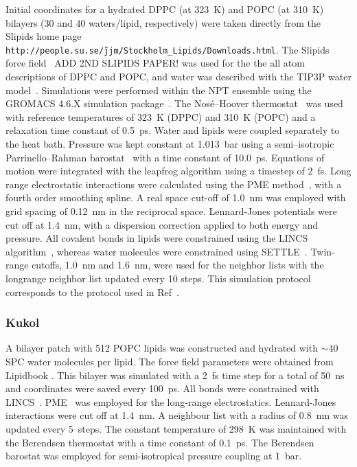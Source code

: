 \documentclass[pre,aps,floatfix,authordate1-4,twocolumn]{revtex4-1}
\begin{document}
Initial coordinates for a hydrated DPPC (at 323~K) and POPC (at 310~K) bilayers (30 and 40 waters/lipid, respectively) were taken directly from the Slipids home page \texttt{http://people.su.se/\~jjm/Stockholm\_Lipids/Downloads.html}.  The Slipids force field~\cite{jambeck12,XXX} ADD 2ND SLIPIDS PAPER! was used for the the all atom descriptions of DPPC and POPC, and
water was described with the TIP3P water model~\cite{jorgensen83}. Simulations were performed within the NPT ensemble using the GROMACS 4.6.X simulation
package~\cite{hess08}. The Nos\'{e}--Hoover thermostat~\cite{nose84,hoover85} was used with reference temperatures of
323~K (DPPC) and 310~K (POPC) and a relaxation time constant of 0.5~ps. Water and lipids were coupled separately to
the heat bath. Pressure was kept constant at 1.013~bar using a semi--isotropic Parrinello--Rahman
barostat~\cite{parrinello81} with a time constant of 10.0~ps. Equations of motion were
integrated with the leapfrog algorithm using a timestep of 2~fs. Long range
electrostatic interactions were calculated using the PME method~\cite{darden93,essman95}, with a fourth order
smoothing spline. A real space cut-off of 1.0~nm was employed with grid spacing of 0.12~nm in the reciprocal space.
Lennard-Jones potentials were cut off at 1.4~nm, with a dispersion correction applied to both energy and pressure. All covalent bonds in lipids were constrained using the LINCS algorithm~\cite{hess97}, 
whereas water molecules were constrained using SETTLE~\cite{miyamoto92}. Twin-range cutoffs,
1.0~nm and 1.6~nm, were used for the neighbor lists with the longrange neighbor list updated every
10 steps. This simulation protocol corresponds to the protocol used in Ref~\cite{jambeck13}. 

\subsubsection{Kukol}
A bilayer patch with 512 POPC lipids was constructed and hydrated with $\sim$40 SPC water molecules per lipid. 
The force field parameters were obtained from Lipidbook \cite{domanski10}.
This bilayer was simulated with a 2~fs time step for a total of 50~ns and coordinates were saved every 100~ps. 
All bonds were constrained with LINCS~\cite{hess97,hess07}. PME~\cite{darden93,essman95} was employed for the long-range electrostatics. Lennard-Jones interactions 
were cut off at 1.4~nm. A neighbour list with a radius of 0.8~nm was updated every 5~steps. The constant temperature of 298~K 
was maintained with the Berendsen thermostat \cite{berendsen84} with a time constant of 0.1~ps. The Berendsen barostat \cite{berendsen84} 
was employed for semi-isotropical pressure coupling at 1~bar.
\end{document}

